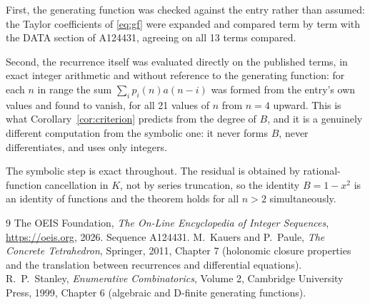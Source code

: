 \documentclass[11pt,a4paper]{article}
\theoremstyle{plain}
\theoremstyle{definition}
\begin{document}
First, the generating function was checked against the entry rather than assumed: the
Taylor coefficients of \eqref{eq:gf} were expanded and compared term by term with the DATA
section of A124431, agreeing on all 13 terms compared.

Second, the recurrence itself was evaluated directly on the published terms, in exact
integer arithmetic and without reference to the generating function: for each $n$ in range
the sum $\sum_{i}p_{i}(n)a(n-i)$ was formed from the entry's own values and found to
vanish, for all 21 values of $n$ from $n=4$ upward. This is what
Corollary~\ref{cor:criterion} predicts from the degree of $B$, and it is a genuinely
different computation from the symbolic one: it never forms $B$, never differentiates, and
uses only integers.

The symbolic step is exact throughout. The residual is obtained by rational-function
cancellation in $K$, not by series truncation, so the identity $B=1 - x^{2}$ is an
identity of functions and the theorem holds for all $n>2$ simultaneously.

\begin{thebibliography}{9}
 The OEIS Foundation, \emph{The On-Line Encyclopedia of Integer Sequences},
\url{https://oeis.org}, 2026. Sequence A124431.
 M.~Kauers and P.~Paule, \emph{The Concrete Tetrahedron}, Springer, 2011,
Chapter 7 (holonomic closure properties and the translation between recurrences and
differential equations).
 R.~P.~Stanley, \emph{Enumerative Combinatorics}, Volume 2, Cambridge
University Press, 1999, Chapter 6 (algebraic and D-finite generating functions).
\end{thebibliography}
\end{document}
